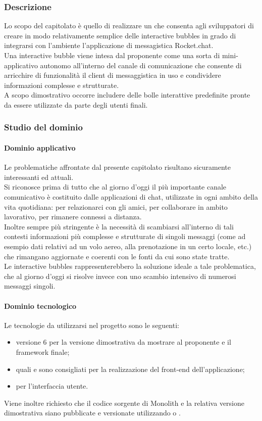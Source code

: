 		\subsubsection{Descrizione}
		Lo scopo del capitolato è quello di realizzare un  che consenta agli sviluppatori di creare in modo relativamente semplice delle 
		interactive bubbles in grado di integrarsi con l'ambiente l'applicazione di messagistica Rocket.chat.
		\\Una interactive bubble viene intesa dal proponente come una sorta di mini-applicativo autonomo all'interno del canale di comunicazione 
		che consente di arricchire di funzionalità il client di messaggistica in uso e condividere informazioni complesse e strutturate. 
		\\A scopo dimostrativo occorre includere delle bolle interattive predefinite pronte da essere utilizzate da parte degli utenti finali.
		
		\subsubsection{Studio del dominio}
			\paragraph{Dominio applicativo}
			Le problematiche affrontate dal presente capitolato risultano sicuramente interessanti ed attuali.
			\\Si riconosce prima di tutto che al giorno d'oggi il più importante canale comunicativo è costituito dalle applicazioni di chat, 
			utilizzate in ogni ambito della vita quotidiana: per relazionarci con gli amici, per collaborare in ambito lavorativo, per rimanere 
			connessi a distanza.
			\\Inoltre sempre più stringente è la necessità di scambiarsi all'interno di tali contesti informazioni più complesse e strutturate di singoli messaggi 
			(come ad esempio dati relativi ad un volo aereo, alla prenotazione in un certo locale, etc.) che rimangano aggiornate e coerenti con 
			le fonti da cui sono state tratte.
			\\Le interactive bubbles rappresenterebbero la soluzione ideale a tale problematica, che al giorno d'oggi si risolve invece con uno 
			scambio intensivo di numerosi messaggi singoli. 
			\paragraph{Dominio tecnologico}
			Le tecnologie da utilizzarsi nel progetto sono le seguenti:
			\begin{itemize}
				\item {} versione 6 per la versione dimostrativa da mostrare al proponente e il {framework} finale;
				\item {} quali  e  sono consigliati per la realizzazione del front-end dell'applicazione;
				\item {} per l'interfaccia utente.
			\end{itemize}
			Viene inoltre richiesto che il codice sorgente di Monolith e la relativa versione dimostrativa siano pubblicate e versionate utilizzando 
			 o .
